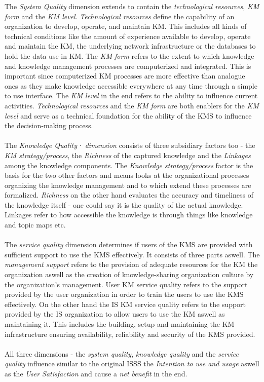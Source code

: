 \documentclass[
	english,
	ruledheaders=section,%
	class=report,%
	thesis={type=bachelor},%
	accentcolor=1b,%
	custommargins=true,%
	marginpar=false,%
	parskip=half-,%
	fontsize=11pt,%
	DIV=14,
]{tudapub}
\begin{document}
The \textit{System Quality} dimension extends to contain the \textit{technological resources}, \textit{KM form} and the \textit{KM level}. \textit{Technological resources} define the capability of an organization to develop, operate, and maintain KM. This includes all kinds of technical conditions like the amount of experience available to develop, operate and maintain the KM, the underlying network infrastructure or the databases to hold the data use in KM. The \textit{KM form} refers to the extent to which knowledge and knowledge management processes are computerized and integrated. This is important since computerized KM processes are more effective than analogue ones as they make knowledge accessible everywhere at any time through a simple to use interface. The \textit{KM level} in the end refers to the ability to influence current activities. \textit{Technological resources} and the \textit{KM form} are both enablers for the \textit{KM level} and serve as a technical foundation for the ability of the KMS to influence the decision-making process.\\\\
The \textit{Knowledge Quality· dimension} consists of three subsidiary factors too - the \textit{KM strategy/process}, the \textit{Richness} of the captured knowledge and the \textit{Linkages} among the knowledge components. The \textit{Knowledge strategy/process} factor is the basis for the two other factors and means looks at the organizational processes organizing the knowledge management and to which extend these processes are formalized. \textit{Richness} on the other hand evaluates the accuracy and timeliness of the knowledge itself - one could say it is the quality of the actual knowledge. Linkages refer to how accessible the knowledge is through things like knowledge and topic maps etc.\\\\
The \textit{service quality} dimension determines if users of the KMS are provided with sufficient support to use the KMS effectively. It consists of three parts aswell. The \textit{management support} refers to the provision of adequate resources for the KM the organization aswell as the creation of knowledge-sharing organization culture by the organization's management. User KM service quality refers to the support provided by the user organization in order to train the users to use the KMS effectively. On the other hand the IS KM service quality refers to the support provided by the  IS organization to allow users to use the KM aswell as maintaining it. This includes the building, setup and maintaining the KM infrastructure ensuring availability, reliability and security of the KMS provided.\\\\
All three dimensions - the \textit{system quality}, \textit{knowledge quality} and the \textit{service quality} influence similar to the original ISSS the \textit{Intention to use and usage} aswell as the \textit{User Satisfaction} and cause a \textit{net benefit} in the end.
\end{document}
